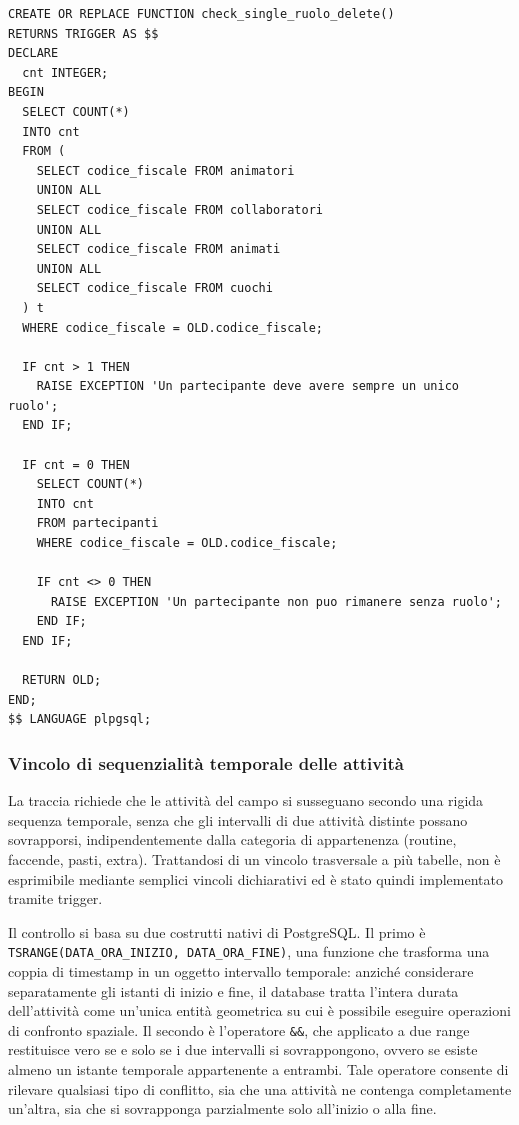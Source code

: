 \documentclass[11pt,a4paper]{article}
\begin{document}
\begin{verbatim}
CREATE OR REPLACE FUNCTION check_single_ruolo_delete()
RETURNS TRIGGER AS $$
DECLARE
  cnt INTEGER;
BEGIN
  SELECT COUNT(*)
  INTO cnt
  FROM (
    SELECT codice_fiscale FROM animatori
    UNION ALL
    SELECT codice_fiscale FROM collaboratori
    UNION ALL
    SELECT codice_fiscale FROM animati
    UNION ALL
    SELECT codice_fiscale FROM cuochi
  ) t
  WHERE codice_fiscale = OLD.codice_fiscale;

  IF cnt > 1 THEN
    RAISE EXCEPTION 'Un partecipante deve avere sempre un unico ruolo';
  END IF;

  IF cnt = 0 THEN
    SELECT COUNT(*)
    INTO cnt
    FROM partecipanti
    WHERE codice_fiscale = OLD.codice_fiscale;

    IF cnt <> 0 THEN
      RAISE EXCEPTION 'Un partecipante non puo rimanere senza ruolo';
    END IF;
  END IF;

  RETURN OLD;
END;
$$ LANGUAGE plpgsql;
\end{verbatim}

\subsubsection{Vincolo di sequenzialità temporale delle attività}

La traccia richiede che le attività del campo si susseguano secondo una rigida sequenza
temporale, senza che gli intervalli di due attività distinte possano sovrapporsi,
indipendentemente dalla categoria di appartenenza (routine, faccende, pasti, extra). Trattandosi
di un vincolo trasversale a più tabelle, non è esprimibile mediante semplici vincoli
dichiarativi ed è stato quindi implementato tramite trigger.

Il controllo si basa su due costrutti nativi di PostgreSQL. Il primo è
\texttt{TSRANGE(DATA\_ORA\_INIZIO, DATA\_ORA\_FINE)}, una funzione che trasforma una coppia di
timestamp in un oggetto intervallo temporale: anziché considerare separatamente gli istanti di
inizio e fine, il database tratta l'intera durata dell'attività come un'unica entità geometrica
su cui è possibile eseguire operazioni di confronto spaziale. Il secondo è l'operatore
\texttt{\&\&}, che applicato a due range restituisce vero se e solo se i due intervalli si
sovrappongono, ovvero se esiste almeno un istante temporale appartenente a entrambi. Tale
operatore consente di rilevare qualsiasi tipo di conflitto, sia che una attività ne contenga
completamente un'altra, sia che si sovrapponga parzialmente solo all'inizio o alla fine.
\end{document}

